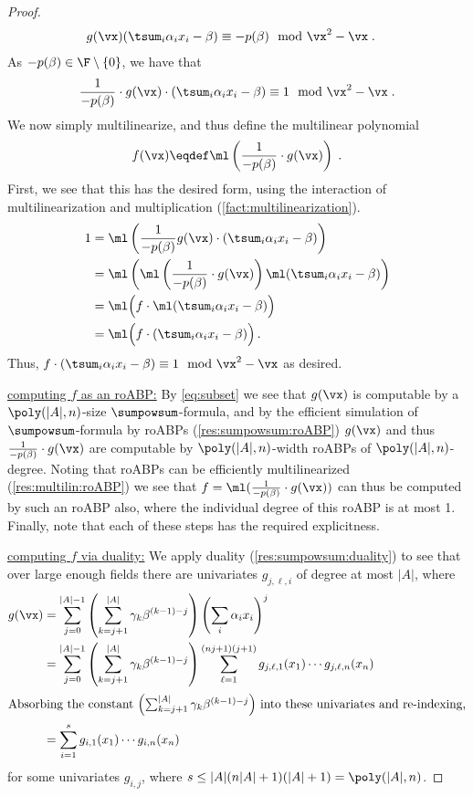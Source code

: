 \documentclass{toc}
\begin{document}
\begin{proof}
        \begin{align*}
                g(\vx) (\tsum_i \alpha_ix_i-\beta)
                &\equiv -p(\beta)\mod\vx^2-\vx
                \;.
        \end{align*}
        As $-p(\beta)\in\F\setminus\{0\}$, we have that
        \[
                \frac{1}{-p(\beta)}\cdot g(\vx) \cdot \left(\tsum_i \alpha_ix_i-\beta\right)\equiv 1 \mod \vx^2-\vx
                \;.
        \]
        We now simply multilinearize, and thus define the multilinear polynomial
        \[
                f(\vx)\eqdef \ml\left(\frac{1}{-p(\beta)}\cdot g(\vx)\right)
                \;.
        \]
        First, we see that this has the desired form, using the interaction of multilinearization and multiplication (\autoref{fact:multilinearization}).
        \begin{align*}
                1
                &=\ml\left(\frac{1}{-p(\beta)} g(\vx) \cdot (\tsum_i \alpha_ix_i-\beta)\right)\\
                &=\ml\left(\ml\left(\frac{1}{-p(\beta)}\cdot g(\vx)\right)\ml(\tsum_i \alpha_ix_i-\beta)\right)\\
                &=\ml\Big(f \cdot \ml(\tsum_i \alpha_ix_i-\beta)\Big)\\
                &=\ml\Big(f\cdot (\tsum_i \alpha_ix_i-\beta)\Big)\,.
        \end{align*}
        Thus, $f\cdot (\tsum_i \alpha_ix_i-\beta)\equiv 1\mod\vx^2-\vx$ as desired.

        \uline{computing $f$ as an roABP:}  By \autoref{eq:subset} we see that $g(\vx)$ is computable by a $\poly(|A|,n)$-size $\sumpowsum$-formula, and by the efficient simulation of $\sumpowsum$-formula by roABPs (\autoref{res:sumpowsum:roABP}) $g(\vx)$ and thus $\frac{1}{-p(\beta)}\cdot g(\vx)$ are computable by $\poly(|A|,n)$-width roABPs of $\poly(|A|,n)$-degree. Noting that roABPs can be efficiently multilinearized (\autoref{res:multilin:roABP}) we see that $f=\ml(\frac{1}{-p(\beta)}\cdot g(\vx))$ can thus be computed by such an roABP also, where the individual degree of this roABP is at most 1. Finally, note that each of these steps has the required explicitness.

        \uline{computing $f$ via duality:} We apply duality (\autoref{res:sumpowsum:duality}) to see that over large enough fields there are univariates $g_{j,\ell,i}$ of degree at most $|A|$, where
        \begin{align*}
                g(\vx)
                &=\sum_{j=0}^{|A|-1}\left(\sum_{k=j+1}^{|A|} \gamma_k\beta^{(k-1)-j} \right) \left(\sum_i \alpha_i x_i\right)^j\\
                &=\sum_{j=0}^{|A|-1}\left(\sum_{k=j+1}^{|A|} \gamma_k\beta^{(k-1)-j} \right) \sum_{\ell=1}^{(nj+1)(j+1)}g_{j,\ell,1}(x_1)\cdots g_{j,\ell,n}(x_n)\,\\
                \intertext{Absorbing the constant $\left(\sum_{k=j+1}^{|A|} \gamma_k\beta^{(k-1)-j} \right)$ into these univariates and re-indexing,}
                &=\sum_{i=1}^{s} g_{i,1}(x_1)\cdots g_{i,n}(x_n)
        \end{align*}
        for some univariates $g_{i,j}$, where $s\le |A|(n|A|+1)(|A|+1)=\poly(|A|,n)$.


\end{proof}
\end{document}
